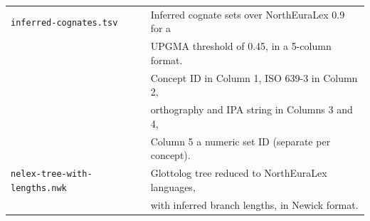 \begin{center}
\begin{longtable}{ll}
 \hline
  \texttt{inferred-cognates.tsv} 
  & Inferred cognate sets over NorthEuraLex 0.9 for a\\
  & UPGMA threshold of 0.45, in a 5-column format.\\
  & Concept ID in Column 1, ISO 639-3 in Column 2,\\
  & orthography and IPA string in Columns 3 and 4,\\
  & Column 5 a numeric set ID (separate per concept).\\
 \hline
  \texttt{nelex-tree-with-lengths.nwk} 
  & Glottolog tree reduced to NorthEuraLex languages,\\
  & with inferred branch lengths, in Newick format.\\
\end{longtable}
\end{center}
